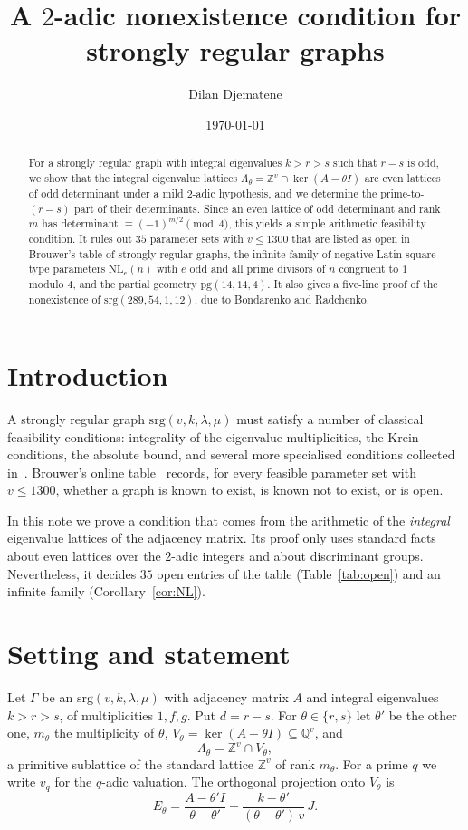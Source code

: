 \documentclass[11pt]{amsart}
\title{A $2$-adic nonexistence condition for strongly regular graphs}
\author{Dilan Djematene}
\date{\today}
\theoremstyle{remark}
\newcommand{\Z}{\mathbb{Z}}
\newcommand{\Q}{\mathbb{Q}}
\begin{document}
\begin{abstract}
For a strongly regular graph with integral eigenvalues $k>r>s$ such that $r-s$ is odd, we show that the integral
eigenvalue lattices $\Lambda_\theta=\Z^v\cap\ker(A-\theta I)$ are even lattices of odd determinant under a mild
$2$-adic hypothesis, and we determine the prime-to-$(r-s)$ part of their determinants. Since an even lattice of odd
determinant and rank $m$ has determinant $\equiv(-1)^{m/2}\pmod 4$, this yields a simple arithmetic feasibility
condition. It rules out $35$ parameter sets with $v\le 1300$ that are listed as open in Brouwer's table of strongly
regular graphs, the infinite family of negative Latin square type parameters $\mathrm{NL}_e(n)$ with $e$ odd and all
prime divisors of $n$ congruent to $1$ modulo $4$, and the partial geometry $\mathrm{pg}(14,14,4)$. It also gives a
five-line proof of the nonexistence of $\mathrm{srg}(289,54,1,12)$, due to Bondarenko and Radchenko.
\end{abstract}
\maketitle

\section{Introduction}
A strongly regular graph $\mathrm{srg}(v,k,\lambda,\mu)$ must satisfy a number of classical feasibility conditions:
integrality of the eigenvalue multiplicities, the Krein conditions, the absolute bound, and several more specialised
conditions collected in~\cite{BvM}. Brouwer's online table~\cite{Btab} records, for every feasible parameter set with
$v\le 1300$, whether a graph is known to exist, is known not to exist, or is open.

In this note we prove a condition that comes from the arithmetic of the \emph{integral} eigenvalue lattices of the
adjacency matrix. Its proof only uses standard facts about even lattices over the $2$-adic integers and about
discriminant groups. Nevertheless, it decides $35$ open entries of the table (Table~\ref{tab:open}) and an infinite
family (Corollary~\ref{cor:NL}).

\section{Setting and statement}
Let $\Gamma$ be an $\mathrm{srg}(v,k,\lambda,\mu)$ with adjacency matrix $A$ and integral eigenvalues $k>r>s$, of
multiplicities $1,f,g$. Put $d=r-s$. For $\theta\in\{r,s\}$ let $\theta'$ be the other one, $m_\theta$ the
multiplicity of $\theta$, $V_\theta=\ker(A-\theta I)\subseteq\Q^v$, and
\[
\Lambda_\theta=\Z^v\cap V_\theta ,
\]
a primitive sublattice of the standard lattice $\Z^v$ of rank $m_\theta$. For a prime $q$ we write $v_q$ for the
$q$-adic valuation. The orthogonal projection onto $V_\theta$ is
\begin{equation}\label{eq:E}
E_\theta=\frac{A-\theta' I}{\theta-\theta'}-\frac{k-\theta'}{(\theta-\theta')\,v}\,J .
\end{equation}
\end{document}
